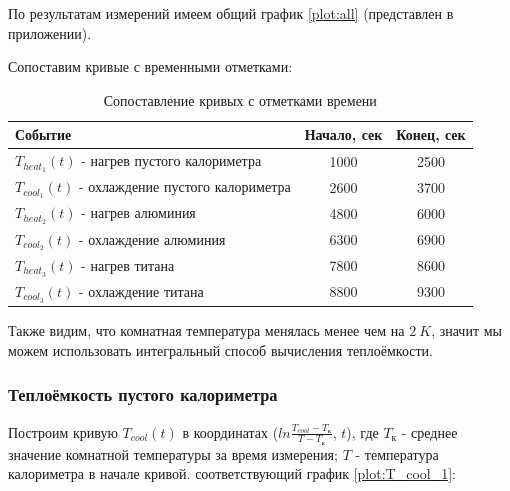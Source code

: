 \documentclass[a4paper, 12pt]{article}
\begin{document}
                По результатам измерений имеем общий график \ref{plot:all} (представлен в приложении).

                Сопоставим кривые с временными отметками:

                \begin{table}[!ht]
                    \centering
                    \begin{tabular}{|l|c|c|}
                        \hline

                        Событие & Начало, сек & Конец, сек\\ \hline
                        $T_{heat_1}(t)$ - нагрев пустого калориметра & 1000 & 2500\\ \hline
                        $T_{cool_1}(t)$ - охлаждение пустого калориметра & 2600 & 3700\\ \hline
                        $T_{heat_2}(t)$ - нагрев алюминия & 4800 & 6000\\ \hline
                        $T_{cool_2}(t)$ - охлаждение алюминия & 6300 & 6900\\ \hline
                        $T_{heat_3}(t)$ - нагрев титана & 7800 & 8600\\ \hline
                        $T_{cool_3}(t)$ - охлаждение титана & 8800 & 9300\\ \hline

                    \end{tabular}
                    \caption{Сопоставление кривых с отметками времени}
                    \label{tab:timetable}
                \end{table}

                Также видим, что комнатная температура менялась менее чем на $2~K$, значит мы можем использовать интегральный способ вычисления теплоёмкости.

            \subsubsection{Теплоёмкость пустого калориметра}

                Построим кривую $T_{cool}(t)$ в координатах ($ln \frac{T_{cool} - T_к}{T - T_к}$, $t$), где $T_к$ - среднее значение комнатной температуры за время измерения; $T$ - температура калориметра в начале кривой. соответствующий график \ref{plot:T_cool_1}:
\end{document}
